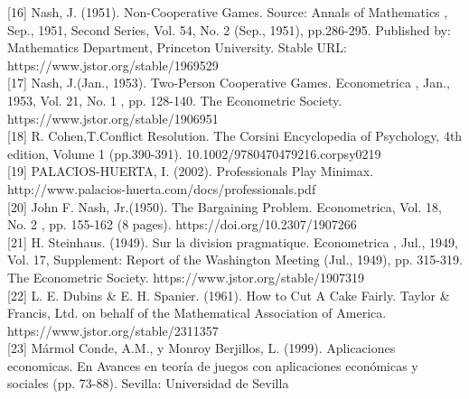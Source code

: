 \documentclass[10pt,a4paper]{book}
\begin{document}
[16] Nash, J. (1951). Non-Cooperative Games. Source:
Annals of Mathematics , Sep., 1951, Second Series, Vol. 54, No. 2 (Sep., 1951), pp.286-295. Published by: Mathematics Department, Princeton University. Stable URL: https://www.jstor.org/stable/1969529\\

[17]  Nash, J.(Jan., 1953). Two-Person Cooperative Games. Econometrica , Jan., 1953, Vol. 21, No. 1 , pp. 128-140. The Econometric Society. \\
https://www.jstor.org/stable/1906951\\

[18] R. Cohen,T.Conflict Resolution. The Corsini Encyclopedia of Psychology, 4th edition, Volume 1 (pp.390-391). 10.1002/9780470479216.corpsy0219\\

[19] PALACIOS-HUERTA, I. (2002). Professionals Play Minimax. http://www.palacios-huerta.com/docs/professionals.pdf \\

[20] John F. Nash, Jr.(1950). The Bargaining Problem. Econometrica, Vol. 18, No. 2 , pp. 155-162 (8 pages). https://doi.org/10.2307/1907266 \\

[21] H. Steinhaus. (1949). Sur la division pragmatique. Econometrica , Jul., 1949, Vol. 17, Supplement: Report of the Washington Meeting (Jul., 1949), pp. 315-319. The Econometric Society. https://www.jstor.org/stable/1907319 \\

[22] L. E. Dubins & E. H. Spanier. (1961). How to Cut A Cake Fairly. Taylor & Francis, Ltd. on behalf of the Mathematical Association of America. \\
https://www.jstor.org/stable/2311357 \\

[23] Mármol Conde, A.M., y Monroy Berjillos, L. (1999). Aplicaciones economicas. En Avances en teoría de juegos con aplicaciones económicas y sociales (pp. 73-88). Sevilla: Universidad de Sevilla \\




	
\end{document}
